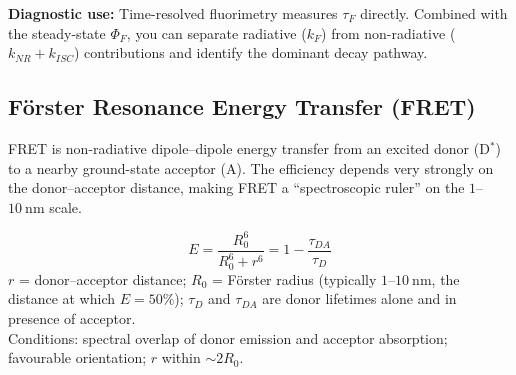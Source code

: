 \documentclass[12pt,a4paper]{article}
\begin{document}
\textbf{Diagnostic use:} Time-resolved fluorimetry measures $\tau_F$ directly. Combined with the steady-state $\Phi_F$, you can separate radiative ($k_F$) from non-radiative ($k_{NR}+k_{ISC}$) contributions and identify the dominant decay pathway.

\subsection{F\"orster Resonance Energy Transfer (FRET)}
FRET is non-radiative dipole--dipole energy transfer from an excited donor (D$^{*}$) to a nearby ground-state acceptor (A). The efficiency depends very strongly on the donor--acceptor distance, making FRET a ``spectroscopic ruler'' on the $1$--$10\ \mathrm{nm}$ scale.

\begin{tcolorbox}[formulabox, title={FRET Efficiency}]
\[
E=\frac{R_0^{6}}{R_0^{6}+r^{6}}=1-\frac{\tau_{DA}}{\tau_D}
\]
$r$ = donor--acceptor distance; $R_0$ = F\"orster radius (typically $1$--$10\ \mathrm{nm}$, the distance at which $E=50\%$); $\tau_D$ and $\tau_{DA}$ are donor lifetimes alone and in presence of acceptor.\\
Conditions: spectral overlap of donor emission and acceptor absorption; favourable orientation; $r$ within $\sim 2 R_0$.
\end{tcolorbox}

\begin{tcolorbox}[tikzbox, title={FRET: Donor and Acceptor Spectral Overlap}]
\centering
{}
\end{tcolorbox}
\end{document}
